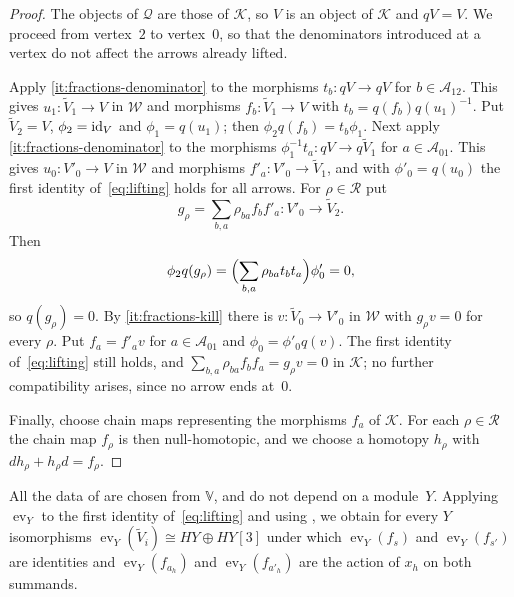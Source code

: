 \begin{proof}
  The objects of $\mathcal{Q}$ are those of $\mathcal{K}$, so $V$ is an object
  of $\mathcal{K}$ and ${qV=V}$. We proceed from vertex~$2$ to vertex~$0$, so that
  the denominators introduced at a vertex do not affect the arrows already
  lifted.

  Apply \eqref{it:fractions-denominator} to the
  morphisms ${t_b\colon qV\to qV}$ for ${b\in\mathcal{A}_{12}}$. This gives
  ${u_1\colon\widetilde{V}_1\to V}$ in $\mathcal{W}$ and morphisms
  ${f_b\colon\widetilde{V}_1\to V}$ with ${t_b=q(f_b)q(u_1)^{-1}}$. Put
  ${\widetilde{V}_2=V}$, ${\phi_2=\id[V]}$ and ${\phi_1=q(u_1)}$; then
  ${\phi_2q(f_b)=t_b\phi_1}$. Next apply
  \eqref{it:fractions-denominator} to the morphisms
  ${\phi_1^{-1}t_a\colon qV\to q\widetilde{V}_1}$ for ${a\in\mathcal{A}_{01}}$.
  This gives ${u_0\colon V'_0\to V}$ in $\mathcal{W}$ and morphisms
  ${f'_a\colon V'_0\to\widetilde{V}_1}$, and with ${\phi'_0=q(u_0)}$ the first
  identity of~\eqref{eq:lifting} holds for all
  arrows. For ${\rho\in\mathcal{R}}$ put
  \[
    g_\rho=\sum_{b,a}\rho_{ba}f_bf'_a\colon V'_0\longrightarrow\widetilde{V}_2.
  \]
  Then
  \[
    \phi_2q(g_\rho)=\Bigl(\sum_{b,a}\rho_{ba}t_bt_a\Bigr)\phi'_0=0,
  \]
  so ${q(g_\rho)=0}$. By \eqref{it:fractions-kill} there
  is ${v\colon\widetilde{V}_0\to V'_0}$ in $\mathcal{W}$ with ${g_\rho v=0}$ for
  every $\rho$. Put ${f_a=f'_av}$ for ${a\in\mathcal{A}_{01}}$ and
  ${\phi_0=\phi'_0q(v)}$. The first identity of~\eqref{eq:lifting} still holds,
  and ${\sum_{b,a}\rho_{ba}f_bf_a=g_\rho v=0}$ in $\mathcal{K}$; no further
  compatibility arises, since no arrow ends at~$0$.

  Finally, choose chain maps representing the morphisms $f_a$ of $\mathcal{K}$.
  For each ${\rho\in\mathcal{R}}$ the chain map $f_\rho$ is then null-homotopic,
  and we choose a homotopy $h_\rho$ with ${dh_\rho+h_\rho d=f_\rho}$.
\end{proof}

All the data of  are chosen from $\mathbb V$, and do not
depend on a module~$Y$. Applying $\operatorname{ev}_Y$ to
the first identity of~\eqref{eq:lifting} and using , we
obtain for every $Y$ isomorphisms
${\operatorname{ev}_Y(\widetilde{V}_i)\cong HY\oplus HY[3]}$ under which
$\operatorname{ev}_Y(f_s)$ and $\operatorname{ev}_Y(f_{s'})$ are identities and
$\operatorname{ev}_Y(f_{a_h})$ and $\operatorname{ev}_Y(f_{a'_h})$ are the
action of $x_h$ on both summands.

